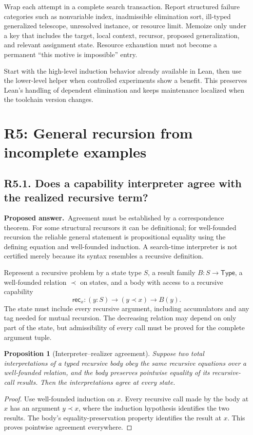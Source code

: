 \documentclass[11pt,a4paper]{article}
\newcommand{\Type}{\mathsf{Type}}
\newcommand{\question}[2]{\subsection{#1. #2}\label{q:#1}}
\newcommand{\answer}{\textbf{Proposed answer.}\ }
\newtheorem{proposition}{Proposition}[section]
\theoremstyle{remark}
\begin{document}
Wrap each attempt in a complete search transaction. Report structured failure
categories such as nonvariable index, inadmissible elimination sort,
ill-typed generalized telescope, unresolved instance, or resource limit.
Memoize only under a key that includes the target, local context, recursor,
proposed generalization, and relevant assignment state. Resource exhaustion
must not become a permanent ``this motive is impossible'' entry.

Start with the high-level induction behavior already available in Lean,
then use the lower-level helper when controlled experiments show a benefit.
This preserves Lean's handling of dependent elimination and keeps maintenance
localized when the toolchain version changes.

\section{R5: General recursion from incomplete examples}
\label{sec:r5}

\question{R5.1}{Does a capability interpreter agree with the realized recursive term?}

\answer Agreement must be established by a correspondence theorem. For some
structural recursors it can be definitional; for well-founded recursion the
reliable general statement is propositional equality using the defining
equation and well-founded induction. A search-time interpreter is not
certified merely because its syntax resembles a recursive definition.

Represent a recursive problem by a state type $S$, a result family
$B:S\to\Type$, a well-founded relation $\prec$ on states, and a body with
access to a recursive capability
\[
 \mathsf{rec}_x:(y:S)\to(y\prec x)\to B(y).
\]
The state must include every recursive argument, including accumulators and
any tag needed for mutual recursion. The decreasing relation may depend on
only part of the state, but admissibility of every call must be proved for
the complete argument tuple.

\begin{proposition}[Interpreter--realizer agreement]\label{prop:recursion}
Suppose two total interpretations of a typed recursive body obey the same
recursive equations over a well-founded relation, and the body preserves
pointwise equality of its recursive-call results. Then the interpretations
agree at every state.
\end{proposition}
\begin{proof}
Use well-founded induction on $x$. Every recursive call made by the body at
$x$ has an argument $y\prec x$, where the induction hypothesis identifies
the two results. The body's equality-preservation property identifies the
result at $x$. This proves pointwise agreement everywhere.
\end{proof}
\end{document}

